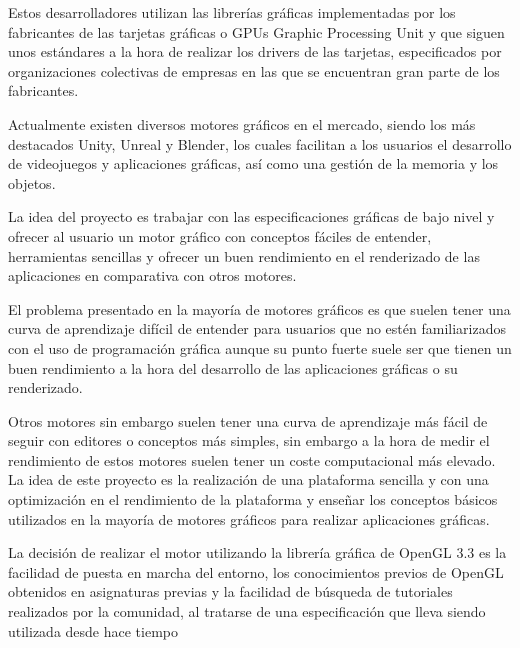 \documentclass[a4paper, 17pt]{book}
\begin{document}
\vspace{1mm} %

Estos desarrolladores utilizan las librerías gráficas implementadas por los fabricantes de las tarjetas
gráficas o GPUs Graphic Processing Unit y que siguen unos estándares a la hora de realizar los drivers
de las tarjetas, especificados por organizaciones colectivas de empresas en las que se encuentran
gran parte de los fabricantes. 

\vspace{1mm} %

Actualmente existen diversos motores gráficos en el mercado, siendo los más destacados Unity, Unreal y Blender,
los cuales facilitan a los usuarios el desarrollo de videojuegos y aplicaciones gráficas, así como una gestión
de la memoria y los objetos.

\vspace{1mm} %

La idea del proyecto es trabajar con las especificaciones gráficas de bajo nivel y ofrecer al usuario un motor
gráfico con conceptos fáciles de entender, herramientas sencillas y ofrecer un buen rendimiento en el
renderizado de las aplicaciones en comparativa con otros motores. 

\vspace{1mm} %

El problema presentado en la mayoría de motores gráficos es que suelen tener una curva de aprendizaje difícil
de entender para usuarios que no estén familiarizados con el uso de programación gráfica aunque su punto fuerte
suele ser que tienen un buen rendimiento a la hora del desarrollo de las aplicaciones gráficas o su renderizado.

\vspace{1mm} %

Otros motores sin embargo suelen tener una curva de aprendizaje más fácil de seguir con editores o conceptos más simples,
sin embargo a la hora de medir el rendimiento de estos motores suelen tener un coste computacional más elevado.
La idea de este proyecto es la realización de una plataforma sencilla y con una optimización en el rendimiento de la
plataforma y enseñar los conceptos básicos utilizados en la mayoría de motores gráficos para realizar aplicaciones gráficas.

\vspace{1mm} %

La decisión de realizar el motor utilizando la librería gráfica de OpenGL 3.3 es la facilidad de puesta en marcha del
entorno, los conocimientos previos de OpenGL obtenidos en asignaturas previas y la facilidad de búsqueda de tutoriales
realizados por la comunidad, al tratarse de una especificación que lleva siendo utilizada desde hace tiempo
\end{document}
